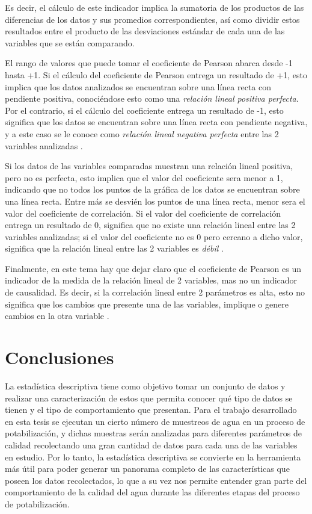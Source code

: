 Es decir, el cálculo de este indicador implica la sumatoria de los productos de las diferencias de los datos y sus promedios correspondientes, así como dividir estos resultados entre el producto de las desviaciones estándar
de cada una de las variables que se están comparando.

El rango de valores que puede tomar el coeficiente de Pearson abarca desde -1 hasta +1. Si el cálculo del coeficiente de Pearson entrega un resultado de +1, esto implica que los datos analizados se encuentran sobre una 
línea recta con pendiente positiva, conociéndose esto como una \textit{relación lineal positiva perfecta}. Por el contrario, si el cálculo del coeficiente entrega un resultado de -1, esto significa que los datos se encuentran 
sobre una línea recta con pendiente negativa, y a este caso se le conoce como \textit{relación lineal negativa perfecta} entre las 2 variables analizadas \cite{anderson}.

Si los datos de las variables comparadas muestran una relación lineal positiva, pero no es perfecta, esto implica que el valor del coeficiente sera menor a 1, indicando que no todos los puntos de la gráfica de los datos se 
encuentran sobre una línea recta. Entre más se desvién los puntos de una línea recta, menor sera el valor del coeficiente de correlación. Si el valor del coeficiente de correlación entrega un resultado de 0, significa que no 
existe una relación lineal entre las 2 variables analizadas; si el valor del coeficiente no es 0 pero cercano a dicho valor, significa que la relación lineal entre las 2 variables es \textit{débil} \cite{anderson}.

Finalmente, en este tema hay que dejar claro que el coeficiente de Pearson es un indicador de la medida de la relación lineal de 2 variables, mas no un indicador de causalidad. Es decir, si la correlación lineal entre 2 
parámetros es alta, esto no significa que los cambios que presente una de las variables, implique o genere cambios en la otra variable \cite{anderson} \cite{mendivelso_prueba_2022}.

\section{Conclusiones}

La estadística descriptiva tiene como objetivo tomar un conjunto de datos y realizar una caracterización de estos que permita conocer qué tipo de datos se tienen y el tipo de comportamiento que presentan. Para el trabajo 
desarrollado en esta tesis se ejecutan un cierto número de muestreos de agua en un proceso de potabilización, y dichas muestras serán analizadas para diferentes parámetros de calidad recolectando una gran cantidad de datos 
para cada una de las variables en estudio. Por lo tanto, la estadística descriptiva se convierte en la herramienta más útil para poder generar un panorama completo de las características que poseen los datos recolectados, 
lo que a su vez nos permite entender gran parte del comportamiento de la calidad del agua durante las diferentes etapas del proceso de potabilización.

